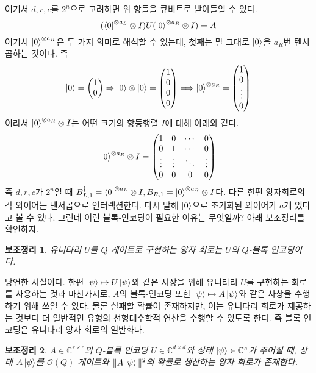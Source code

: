\documentclass[a4paper,atbegshi,chapter,]{oblivoir}
\newtheorem{lemm}{보조정리}[chapter]
\begin{document}
여기서 $d,r,c$를 $2^n$으로 고려하면 위 항들을 큐비트로 받아들일 수 있다.
\begin{equation}\label{equ:1-2}
  (\bra0^{\otimes a_L}\otimes I)U(\ket0^{\otimes a_R}\otimes I) = A
\end{equation}
여기서 $\ket{0}^{\otimes a_R}$은 두 가지 의미로 해석할 수 있는데, 첫째는
말 그대로 $\ket0$을 $a_R$번 텐서곱하는 것이다. 즉 
\[
  \ket0 = \begin{pmatrix}1\\0\end{pmatrix}\Rightarrow
  \ket0\otimes\ket0 = \begin{pmatrix}1\\0\\0\\0\end{pmatrix}\Longrightarrow
  \ket0^{\otimes a_R} = \begin{pmatrix}1\\0\\\vdots\\0\end{pmatrix}
\]
이라서 $\ket0^{\otimes a_R}\otimes I$는 어떤 크기의 항등행렬 $I$에 대해 아래와
같다.
\[
  \ket0^{\otimes a_R}\otimes I =
  \begin{pmatrix}1&0&\cdots&0\\0&1&\cdots&0\\\vdots&\vdots&\ddots&\vdots\\0&0&0&0
  \end{pmatrix}
\]
즉 $d,r,c$가 $2^n$일 때 $B_{L,1}^{\dagger}=\bra{0}^{\otimes a_L}\otimes I,
B_{R,1}=\ket0^{\otimes a_R}\otimes I$다. 다른 한편 양자회로의 각 와이어는
텐서곱으로 인터랙션한다. 다시 말해 $\ket0$으로 초기화된 와이어가 $a$개
있다고 볼 수 있다. 그런데 이런 블록-인코딩이 필요한 이유는 무엇일까? 
아래 보조정리를 확인하자. 
\begin{lemm}
  유니타리 $U$를 $Q$ 게이트로 구현하는 양자 회로는 $U$의 $Q$-블록 인코딩이다.
\end{lemm}
당연한 사실이다. 한편 $\ket{\psi}\mapsto U\ket{\psi}$와 같은 사상을 위해
유니타리 $U$를 구현하는 회로를 사용하는 것과 마찬가지로, $A$의 블록-인코딩 또한
$\ket{\psi}\mapsto A\ket{\psi}$와 같은 사상을 수행하기 위해 쓰일 수 있다. 물론
실패할 확률이 존재하지만, 이는 유니타리 회로가 제공하는 것보다 더 일반적인
유형의 선형대수학적 연산을 수행할 수 있도록 한다. 즉 블록-인코딩은 유니타리
양자 회로의 일반화다.
\begin{lemm}
  $A\in\mathbb{C}^{r\times c}$의 $Q$-블록 인코딩 $U\in\mathbb{C}^{d\times d}$와
  상태 $\ket{\psi}\in\mathbb{C}^c$가 주어질 때, 상태
  $A\ket{\psi}$를 $\mathcal{O}(Q)$ 게이트와 
  $\|A\ket{\psi}\|^2$의 확률로 생산하는 양자 회로가 존재한다.
\end{lemm}
\end{document}
